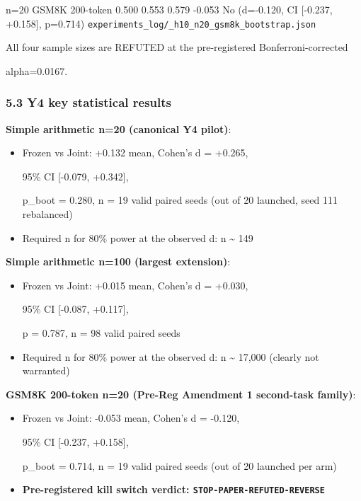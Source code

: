 \documentclass[
]{article}
\begin{document}
n=20 \textbar{} GSM8K 200-token \textbar{} 0.500 \textbar{} 0.553
\textbar{} 0.579 \textbar{} -0.053 \textbar{} No (d=-0.120, CI
{[}-0.237, +0.158{]}, p=0.714) \textbar{}
\texttt{experiments\_log/\_h10\_n20\_gsm8k\_bootstrap.json} \textbar{}

All four sample sizes are REFUTED at the pre-registered
Bonferroni-corrected

alpha=0.0167.

\subsubsection{5.3 Y4 key statistical
results}\label{y4-key-statistical-results}

\textbf{Simple arithmetic n=20 (canonical Y4 pilot)}:

\begin{itemize}
\item
  Frozen vs Joint: +0.132 mean, Cohen's d = +0.265,

  95\% CI {[}-0.079, +0.342{]},

  p\_boot = 0.280, n = 19 valid paired seeds (out of 20 launched, seed
  111 rebalanced)
\item
  Required n for 80\% power at the observed d: n \textasciitilde{} 149
\end{itemize}

\textbf{Simple arithmetic n=100 (largest extension)}:

\begin{itemize}
\item
  Frozen vs Joint: +0.015 mean, Cohen's d = +0.030,

  95\% CI {[}-0.087, +0.117{]},

  p = 0.787, n = 98 valid paired seeds
\item
  Required n for 80\% power at the observed d: n \textasciitilde{}
  17,000 (clearly not warranted)
\end{itemize}

\textbf{GSM8K 200-token n=20 (Pre-Reg Amendment 1 second-task family)}:

\begin{itemize}
\item
  Frozen vs Joint: -0.053 mean, Cohen's d = -0.120,

  95\% CI {[}-0.237, +0.158{]},

  p\_boot = 0.714, n = 19 valid paired seeds (out of 20 launched per
  arm)
\item
  \textbf{Pre-registered kill switch verdict:
  \texttt{STOP-PAPER-REFUTED-REVERSE}}
\end{itemize}
\end{document}
